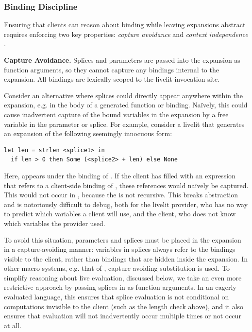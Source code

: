 
\subsubsection{Binding Discipline}\label{sec:hygiene}


Ensuring that clients can reason about binding while leaving expansions
 abstract
 requires enforcing two key properties: \emph{capture avoidance}
and \emph{context independence} \cite{TLMs,adamsHygiene,DBLP:conf/popl/ClingerR91}.

\textbf{Capture Avoidance.}
Splices and parameters are passed into the expansion as function arguments, 
so they cannot capture any bindings internal to the expansion. All bindings 
are lexically scoped to the livelit invocation site.

Consider an alternative where 
splices could directly appear anywhere within the expansion, 
e.g. in the body of a generated function or  binding.
Na\"ively, this could cause inadvertent capture of the bound variables in the expansion by a free variable
in the parameter or splice. For example, consider a livelit that generates an expansion
of the following seemingly innocuous form:
\begin{lstlisting}[numbers=none]
  let len = strlen <splice1> in
  if len > 0 then Some (<splice2> + len) else None 
\end{lstlisting}
Here,  appears under the binding of . If the client has filled
 with an expression that refers to a client-side binding of ,
these references would na\"ively be captured. This would not occur in ,
because the  is not recursive.
This breaks abstraction and is notoriously difficult to debug,
both for the livelit provider, who has no way to predict which variables a client will use,
 and the client, who does not know which variables the provider used.

To avoid this situation, parameters and splices must be placed in the expansion
in a capture-avoiding manner: variables in splices
always refer to the bindings visible to the client,
rather than bindings that are hidden inside the expansion.
In other macro systems, e.g. that of \citet{TLMs}, 
capture avoiding substitution is used. 
To simplify reasoning about live evaluation, discussed below, we take 
an even more restrictive approach by passing splices in as function 
arguments. In an eagerly evaluated language, this ensures that 
splice evaluation is not conditional on computations invisible to the 
client (such as the length check above), 
and it also ensures that evaluation will not inadvertently 
occur multiple times or not occur at all. 

